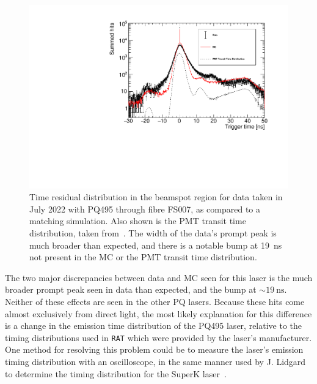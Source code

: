 \begin{figure}
    \centering
    \includegraphics[width=\textwidth]{4_SMELLIESimulation/images/data_vs_mc_vs_tts_FS007_PQ495.pdf}
    \caption[Time residual distribution in the beamspot region for data taken in July 2022 with PQ495 through fibre FS007, as compared to a matching simulation]
    {Time residual distribution in the beamspot region for data taken in July 2022 with PQ495 through fibre FS007, as compared to a matching simulation. Also shown is the PMT transit time distribution, taken from~\cite{kroupovaPMTTransitTime2018}. The width of the data's prompt peak is much broader than expected, and there is a notable bump at \SI{19}{\ns} not present in the MC or the PMT transit time distribution.}
    \label{fig:smellie_pq495_prompt_timing_data_vs_mc}
\end{figure}

The two major discrepancies between data and MC seen for this laser is the much broader prompt peak seen in data than expected, and the bump at $\sim\SI{19}{\ns}$. Neither of these effects are seen in the other PQ lasers. Because these hits come almost exclusively from direct light, the most likely explanation for this difference is a change in the emission time distribution of the PQ495 laser, relative to the timing distributions used in \texttt{RAT} which were provided by the laser's manufacturer. One method for resolving this problem could be to measure the laser's emission timing distribution with an oscilloscope, in the same manner used by J. Lidgard to determine the timing distribution for the SuperK laser~\cite{lidgardSupercontinuumAdditionSMELLIE2018}.


